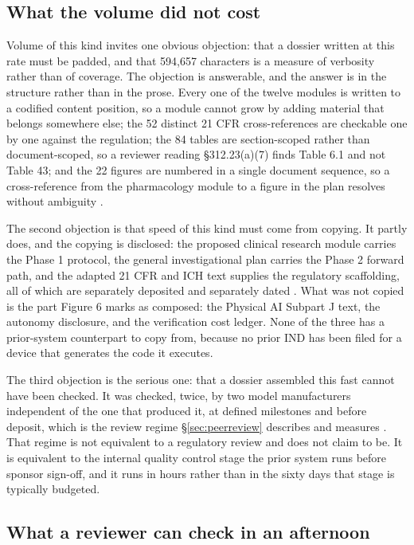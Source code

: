 \subsection{What the volume did not cost}

Volume of this kind invites one obvious objection: that a dossier written at
this rate must be padded, and that 594,657 characters is a measure of verbosity
rather than of coverage. The objection is answerable, and the answer is in the
structure rather than in the prose. Every one of the twelve modules is written
to a codified content position, so a module cannot grow by adding material that
belongs somewhere else; the 52 distinct 21 CFR cross-references are checkable
one by one against the regulation; the 84 tables are section-scoped rather than
document-scoped, so a reviewer reading \S 312.23(a)(7) finds Table 6.1 and not
Table 43; and the 22 figures are numbered in a single document sequence, so a
cross-reference from the pharmacology module to a figure in the plan resolves
without ambiguity \cite{phase1ind}.

The second objection is that speed of this kind must come from copying. It
partly does, and the copying is disclosed: the proposed clinical research module
carries the Phase 1 protocol, the general investigational plan carries the Phase
2 forward path, and the adapted 21 CFR and ICH text supplies the regulatory
scaffolding, all of which are separately deposited and separately dated
\cite{onpremwhippl, phase2proto, natplatform2026}. What was not copied is the
part Figure 6 marks as composed: the Physical AI Subpart J text, the autonomy
disclosure, and the verification cost ledger. None of the three has a
prior-system counterpart to copy from, because no prior IND has been filed for a
device that generates the code it executes.

The third objection is the serious one: that a dossier assembled this fast
cannot have been checked. It was checked, twice, by two model manufacturers
independent of the one that produced it, at defined milestones and before
deposit, which is the review regime \S\ref{sec:peerreview} describes and measures
\cite{aiprgliomatc, rfarm27001v2}. That regime is not equivalent to a regulatory
review and does not claim to be. It is equivalent to the internal quality
control stage the prior system runs before sponsor sign-off, and it runs in
hours rather than in the sixty days that stage is typically budgeted.

\subsection{What a reviewer can check in an afternoon}

